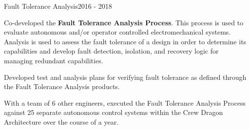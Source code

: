 \begin{cventries}
  \cventry
  {Fault Tolerance Analysis}{}{}{2016 - 2018}
  {
    \begin{cvitems}
    \item Co-developed the \textbf{Fault Tolerance Analysis Process}. This process is used to
      evaluate autonomous and/or operator controlled electromechanical systems. Analysis is used to
      assess the fault tolerance of a design in order to determine its capabilities and develop
      fault detection, isolation, and recovery logic for managing redundant capabilities.
    \item Developed test and analysis plans for verifying fault tolerance as defined through the
      Fault Tolerance Analysis products.
    \item With a team of 6 other engineers, executed the Fault Tolerance Analysis Process against 25
      separate autonomous control systems within the Crew Dragon Architecture over the course of a
      year.
    \end{cvitems}
  }
\end{cventries}
